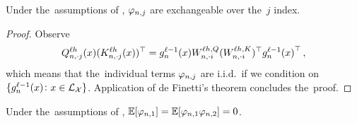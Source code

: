 \begin{lemma}\label{lem:logit_exchangeability}
    Under the~assumptions of , $\varphi_{n, j}$ are exchangeable over the~$j$ index.
\end{lemma}

\begin{proof}
    Observe
    \begin{align*}
        Q_{n, \cdot j}^{\ell h}(x)
        (K_{n, \cdot j}^{\ell h}(x))^\top
        =
        {g}^{\ell - 1}_{n}{(x)} 
        W_{n, \cdot i}^{\ell h, Q}
        (W_{n, \cdot i}^{\ell h, K})^\top
        {g}^{\ell - 1}_{n}{(x)}^\top
        \, ,
    \end{align*}
    which means that the~individual terms $\varphi_{n, j}$ are i.i.d.\ if we condition on
        $\{ {g}^{\ell - 1}_{n}{(x)} \colon x \in \mathcal{L}_{\mathcal{X}} \}$.
    Application of de Finetti's theorem concludes the~proof.
\end{proof}


\begin{lemma}\label{lem:logit_mean_corr_zero}
    Under the~assumptions of ,
    $\operatorname*{\mathbb{E}} [\varphi_{n, 1}] = \operatorname*{\mathbb{E}} [\varphi_{n, 1} \varphi_{n, 2}] = 0$.
\end{lemma}

